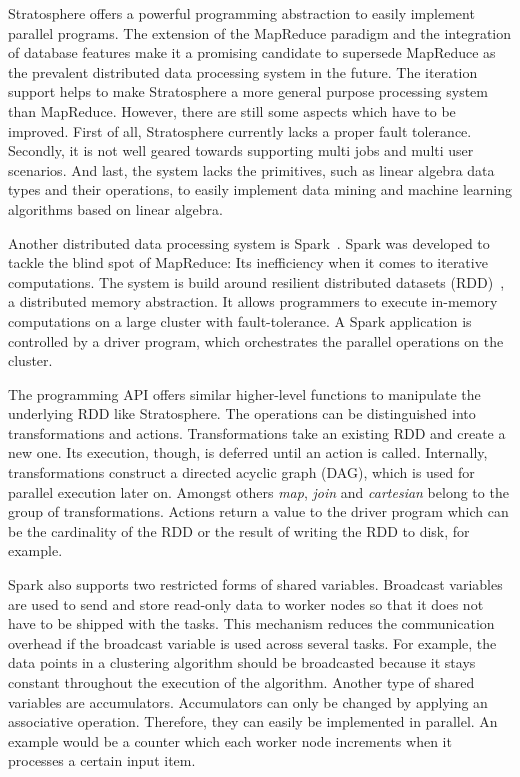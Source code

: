 Stratosphere offers a powerful programming abstraction to easily implement parallel programs.
The extension of the MapReduce paradigm and the integration of database features make it a promising candidate to supersede MapReduce as the prevalent distributed data processing system in the future.
The iteration support helps to make Stratosphere a more general purpose processing system than MapReduce.
However, there are still some aspects which have to be improved.
First of all, Stratosphere currently lacks a proper fault tolerance.
Secondly, it is not well geared towards supporting multi jobs and multi user scenarios.
And last, the system lacks the primitives, such as linear algebra data types and their operations, to easily implement data mining and machine learning algorithms based on linear algebra.

Another distributed data processing system is Spark~\cite{zaharia:2010a}.
Spark was developed to tackle the blind spot of MapReduce: Its inefficiency when it comes to iterative computations.
The system is build around resilient distributed datasets (RDD)~\cite{zaharia:2012a}, a distributed memory abstraction.
It allows programmers to execute in-memory computations on a large cluster with fault-tolerance.
A Spark application is controlled by a driver program, which orchestrates the parallel operations on the cluster.

The programming API offers similar higher-level functions to manipulate the underlying RDD like Stratosphere.
The operations can be distinguished into transformations and actions.
Transformations take an existing RDD and create a new one. 
Its execution, though, is deferred until an action is called.
Internally, transformations construct a directed acyclic graph (DAG), which is used for parallel execution later on.
Amongst others \emph{map}, \emph{join} and \emph{cartesian} belong to the group of transformations.
Actions return a value to the driver program which can be the cardinality of the RDD or the result of writing the RDD to disk, for example.

Spark also supports two restricted forms of shared variables.
Broadcast variables are used to send and store read-only data to worker nodes so that it does not have to be shipped with the tasks.
This mechanism reduces the communication overhead if the broadcast variable is used across several tasks.
For example, the data points in a \kmeans clustering algorithm should be broadcasted because it stays constant throughout the execution of the algorithm.
Another type of shared variables are accumulators.
Accumulators can only be changed by applying an associative operation.
Therefore, they can easily be implemented in parallel.
An example would be a counter which each worker node increments when it processes a certain input item.

